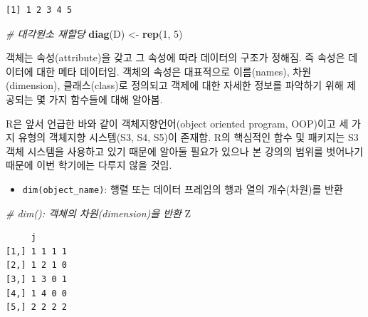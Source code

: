 \documentclass[
  11pt,
]{krantz}
\makeatletter
\newenvironment{Shaded}{\begin{snugshade}}{\end{snugshade}}
\newcommand{\CommentTok}[1]{\textcolor[rgb]{0.37,0.37,0.37}{\textit{#1}}}
\newcommand{\DecValTok}[1]{\textcolor[rgb]{0.06,0.06,0.06}{#1}}
\newcommand{\KeywordTok}[1]{\textcolor[rgb]{0.27,0.27,0.27}{\textbf{#1}}}
\newcommand{\NormalTok}[1]{#1}
\newcommand{\StringTok}[1]{\textcolor[rgb]{0.5,0.5,0.5}{#1}}
\providecommand{\tightlist}{%
  \setlength{\itemsep}{0pt}\setlength{\parskip}{0pt}}
\newenvironment{kframe}{%
\medskip{}
\setlength{\fboxsep}{.8em}
 \def\at@end@of@kframe{}%
 \ifinner\ifhmode%
  \def\at@end@of@kframe{\end{minipage}}%
  \begin{minipage}{\columnwidth}%
 \fi\fi%
 \def\FrameCommand##1{\hskip\@totalleftmargin \hskip-\fboxsep
 \colorbox{shadecolor}{##1}\hskip-\fboxsep
     \hskip-\linewidth \hskip-\@totalleftmargin \hskip\columnwidth}%
 \MakeFramed {\advance\hsize-\width
   \@totalleftmargin\z@ \linewidth\hsize
   \@setminipage}}%
 {\par\unskip\endMakeFramed%
 \at@end@of@kframe}
\newenvironment{rmdblock}[1]
  {
  \begin{itemize}
  \renewcommand{\labelitemi}{
    \raisebox{-.7\height}[0pt][0pt]{
      {\setkeys{Gin}{width=3em,keepaspectratio}\texttt{[image: images/\#1]}}
    }
  }
  \setlength{\fboxsep}{1em}
  \begin{kframe}
  \item
  }
  {
  \end{kframe}
  \end{itemize}
  }
\newenvironment{rmdnote}
  {\begin{rmdblock}{note}}
  {\end{rmdblock}}
\makeatother
\begin{document}
\begin{verbatim}
[1] 1 2 3 4 5
\end{verbatim}

\begin{Shaded}
\begin{Highlighting}[]
\CommentTok{# 대각원소 재할당}
\KeywordTok{diag}\NormalTok{(D) <-}\StringTok{ }\KeywordTok{rep}\NormalTok{(}\DecValTok{1}\NormalTok{, }\DecValTok{5}\NormalTok{)}
\end{Highlighting}
\end{Shaded}

\normalsize

\footnotesize

\begin{rmdnote}
\begin{rmdnote}

객체는 속성(attribute)을 갖고 그 속성에 따라 데이터의 구조가 정해짐. 즉 속성은 데이터에 대한 메타 데이터임. 객체의 속성은 대표적으로 이름(names), 차원(dimension), 클래스(class)로 정의되고 객제에 대한 자세한 정보를 파악하기 위해 제공되는 몇 가지 함수들에 대해 알아봄.

R은 앞서 언급한 바와 같이 객체지향언어(object oriented program, OOP)이고 세 가지 유형의 객체지향 시스템(S3, S4, S5)이 존재함. R의 핵심적인 함수 및 패키지는 S3 객체 시스템을 사용하고 있기 때문에 알아둘 필요가 있으나 본 강의의 범위를 벗어나기 때문에 이번 학기에는 다루지 않을 것임.

\end{rmdnote}
\end{rmdnote}

\normalsize

\begin{itemize}
\tightlist
\item
  \texttt{dim(object\_name)}: 행렬 또는 데이터 프레임의 행과 열의 개수(차원)를 반환
\end{itemize}

\footnotesize

\begin{Shaded}
\begin{Highlighting}[]
\CommentTok{# dim(): 객체의 차원(dimension)을 반환}
\NormalTok{Z}
\end{Highlighting}
\end{Shaded}

\begin{verbatim}
     j      
[1,] 1 1 1 1
[2,] 1 2 1 0
[3,] 1 3 0 1
[4,] 1 4 0 0
[5,] 2 2 2 2
\end{verbatim}
\end{document}
